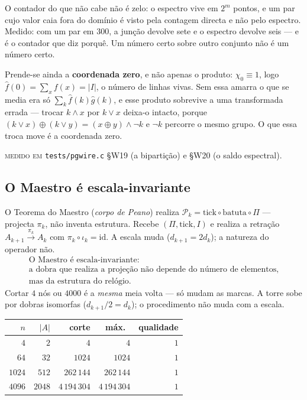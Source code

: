 \documentclass[11pt,a4paper]{article}
\newcommand{\code}[1]{\texttt{\small #1}}
\begin{document}
\noindent O contador do que não cabe não é zelo: o espectro vive em $2^m$ pontos, e um par cujo
valor caia fora do domínio é visto pela contagem directa e não pelo espectro. Medido: com um par em
$300$, a junção devolve sete e o espectro devolve seis --- e é o contador que diz porquê. Um número
certo sobre outro conjunto não é um número certo.

\smallskip
\noindent Prende-se ainda a \textbf{coordenada zero}, e não apenas o produto: $\chi_0\equiv 1$, logo
$\widehat f(0)=\sum_x f(x)=|I|$, o número de linhas vivas. Sem essa amarra o que se media era só
$\sum_k \widehat f(k)\widehat g(k)$, e esse produto sobrevive a uma transformada errada --- trocar
$k\wedge x$ por $k\vee x$ deixa-o intacto, porque $(k\vee x)\oplus(k\vee y)=(x\oplus y)\wedge\neg k$
e $\neg k$ percorre o mesmo grupo. O que essa troca move é a coordenada zero.

\medskip
\noindent \textsc{medido em} \code{tests/pgwire.c} §W19 (a bipartição) e §W20 (o saldo espectral).

\subsection*{O Maestro é escala-invariante}

O Teorema do Maestro (\emph{corpo de Peano}) realiza
$\mathcal{P}_k=\mathrm{tick}\circ\mathrm{batuta}\circ\Pi$ --- projecta $\pi_k$, não inventa
estrutura. Recebe $(\Pi,\mathrm{tick},I)$ e realiza a retração
$A_{k+1}\xrightarrow{\pi_k}A_k$ com $\pi_k\circ\iota_k=\mathrm{id}$. A escala muda
($d_{k+1}=2d_k$); a natureza do operador não.
\[
\boxed{
\begin{array}{c}
\text{O Maestro é escala-invariante:}
\\[0.25em]
\text{a dobra que realiza a projeção não depende do número de elementos,}
\\
\text{mas da estrutura do relógio.}
\end{array}
}
\]
Cortar $4$ nós ou $4000$ é a \emph{mesma} meia volta --- só mudam as marcas. A torre sobe por
dobras isomorfas ($d_{k+1}/2=d_k$); o procedimento não muda com a escala.

\begin{center}\small
\begin{tabular}{@{}rrrrr@{}}
\toprule
$n$ & $|A|$ & corte & máx.\ & qualidade \\
\midrule
$4$ & $2$ & $4$ & $4$ & $1$ \\
$64$ & $32$ & $1024$ & $1024$ & $1$ \\
$1024$ & $512$ & $262\,144$ & $262\,144$ & $1$ \\
$4096$ & $2048$ & $4\,194\,304$ & $4\,194\,304$ & $1$ \\
\bottomrule
\end{tabular}
\end{center}
\end{document}
